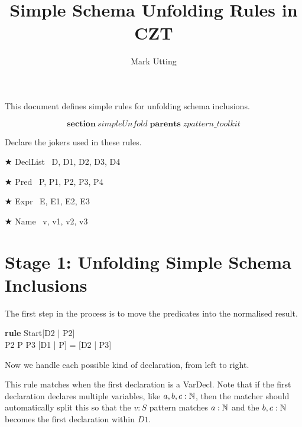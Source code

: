 \documentclass{article}
\title{Simple Schema Unfolding Rules in CZT}
\author{Mark Utting}
\newenvironment{zsection}{\[}{\]}
\newcommand{\SECTION}{\textbf{section}~}
\newcommand{\parents}{\mathrel{\textbf{parents}}}
\newenvironment{zedrule}[1]{\par\textbf{rule }#1\vspace{-1ex}\infrule}{\endinfrule}
\newcommand{\derives}{\derive{}}
\newenvironment{zedjoker}[1]{\par$\bigstar$ #1\ }{}
\begin{document}
\maketitle

This document defines simple rules for unfolding schema inclusions.

\begin{zsection}
  \SECTION simpleUnfold \parents zpattern\_toolkit
\end{zsection}

Declare the jokers used in these rules.

\begin{zedjoker}{DeclList} D, D1, D2, D3, D4 \end{zedjoker} \\
\begin{zedjoker}{Pred} P, P1, P2, P3, P4 \end{zedjoker} \\
\begin{zedjoker}{Expr} E, E1, E2, E3 \end{zedjoker} \\
\begin{zedjoker}{Name} v, v1, v2, v3 \end{zedjoker} \\

\newcommand{\unfoldsTo}{\mathrel{\leadsto}}
\newcommand{\schemamerge}{\mathbin{\textbf{schemamerge}}}
\newcommand{\schemaminus}{\mathbin{\textbf{schemaminus}}}


\section*{Stage 1: Unfolding Simple Schema Inclusions}

The first step in the process is to move the predicates into
the normalised result.
\begin{zedrule}{Start}
   [D1 | true] \unfoldsTo [D2 | P2] \\
   P2 \land P \iff P3
\derives
   [D1 | P] = [D2 | P3]
\end{zedrule}

Now we handle each possible kind of declaration, from left to right.

This rule matches when the first declaration is a VarDecl.
Note that if the first declaration declares multiple variables,
like $a,b,c:{\mathbb N}$, then the matcher should automatically split this
so that the $v:S$ pattern matches $a:{\mathbb N}$ and the $b,c:{\mathbb N}$
becomes the first declaration within $D1$.
\end{document}
